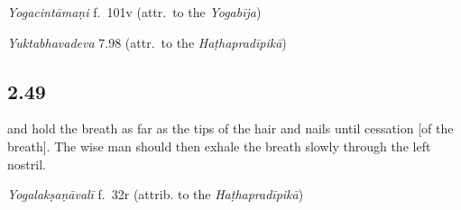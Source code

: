 \begin{ekdosis}
\begin{testimonia}[hp02_048]
\emph{Yogacintāmaṇi} f.~101v (attr.~to the \emph{Yogabīja})

\begin{versinnote}
\end{versinnote} 

\emph{Yuktabhavadeva} 7.98 (attr.~to the \emph{Haṭhapradīpikā})

\begin{versinnote}
\end{versinnote}
\end{testimonia}

\begin{philcomm}[hp02_048]
\end{philcomm}

\subsection*{2.49}
\begin{translation}[hp02_049]
and hold the breath as far as the tips of the hair and nails until cessation [of the breath]. The wise man should then exhale the breath slowly through the left nostril.
\end{translation}


\begin{testimonia}[hp02_049]
\emph{Yogalakṣaṇāvalī} f.~32r (attrib. to the \emph{Haṭhapradīpikā})
\begin{versinnote}
\end{versinnote}


\end{testimonia}
\end{ekdosis}

